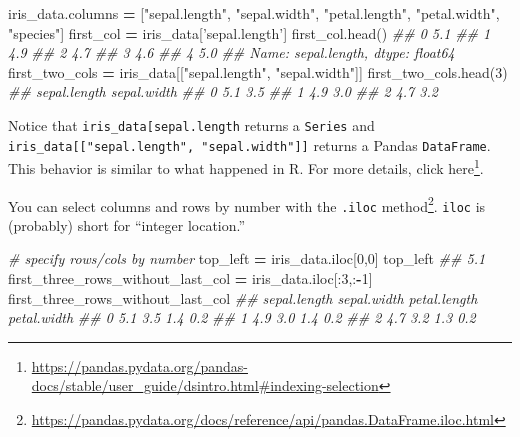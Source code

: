 \documentclass[12pt,krantz2]{krantz}
\makeatletter
\newenvironment{Shaded}{\begin{snugshade}}{\end{snugshade}}
\newcommand{\CommentTok}[1]{\textcolor[rgb]{0.37,0.37,0.37}{\textit{#1}}}
\newcommand{\DecValTok}[1]{\textcolor[rgb]{0.06,0.06,0.06}{#1}}
\newcommand{\NormalTok}[1]{#1}
\newcommand{\OperatorTok}[1]{\textcolor[rgb]{0.43,0.43,0.43}{\textbf{#1}}}
\newcommand{\StringTok}[1]{\textcolor[rgb]{0.5,0.5,0.5}{#1}}
\renewcommand{\href}[2]{#2\footnote{\url{#1}}}
\newenvironment{kframe}{%
\medskip{}
\setlength{\fboxsep}{.8em}
 \def\at@end@of@kframe{}%
 \ifinner\ifhmode%
  \def\at@end@of@kframe{\end{minipage}}%
  \begin{minipage}{\columnwidth}%
 \fi\fi%
 \def\FrameCommand##1{\hskip\@totalleftmargin \hskip-\fboxsep
 \colorbox{shadecolor}{##1}\hskip-\fboxsep
     \hskip-\linewidth \hskip-\@totalleftmargin \hskip\columnwidth}%
 \MakeFramed {\advance\hsize-\width
   \@totalleftmargin\z@ \linewidth\hsize
   \@setminipage}}%
 {\par\unskip\endMakeFramed%
 \at@end@of@kframe}
\renewenvironment{Shaded}{\begin{kframe}}{\end{kframe}}
\makeatother
\begin{document}
\begin{Shaded}
\begin{Highlighting}[]
\NormalTok{iris_data.columns }\OperatorTok{=}\NormalTok{ [}\StringTok{"sepal.length"}\NormalTok{, }\StringTok{"sepal.width"}\NormalTok{, }\StringTok{"petal.length"}\NormalTok{, }
                      \StringTok{"petal.width"}\NormalTok{, }\StringTok{"species"}\NormalTok{]}
\NormalTok{first_col }\OperatorTok{=}\NormalTok{ iris_data[}\StringTok{'sepal.length'}\NormalTok{]}
\NormalTok{first_col.head()}
\CommentTok{## 0    5.1}
\CommentTok{## 1    4.9}
\CommentTok{## 2    4.7}
\CommentTok{## 3    4.6}
\CommentTok{## 4    5.0}
\CommentTok{## Name: sepal.length, dtype: float64}
\NormalTok{first_two_cols }\OperatorTok{=}\NormalTok{ iris_data[[}\StringTok{"sepal.length"}\NormalTok{, }\StringTok{"sepal.width"}\NormalTok{]]}
\NormalTok{first_two_cols.head(}\DecValTok{3}\NormalTok{)}
\CommentTok{##    sepal.length  sepal.width}
\CommentTok{## 0           5.1          3.5}
\CommentTok{## 1           4.9          3.0}
\CommentTok{## 2           4.7          3.2}
\end{Highlighting}
\end{Shaded}

\begin{rmd-details}
Notice that \texttt{iris\_data{[}\textquotesingle{}sepal.length\textquotesingle{}{]}} returns a \texttt{Series} and \texttt{iris\_data{[}{[}"sepal.length",\ "sepal.width"{]}{]}} returns a Pandas \texttt{DataFrame}. This behavior is similar to what happened in R. For more details, click \href{https://pandas.pydata.org/pandas-docs/stable/user_guide/dsintro.html\#indexing-selection}{here}.

\end{rmd-details}

You can select columns and rows by number with the \href{https://pandas.pydata.org/docs/reference/api/pandas.DataFrame.iloc.html}{\texttt{.iloc} method}. \texttt{iloc} is (probably) short for ``integer location.''

\begin{Shaded}
\begin{Highlighting}[]
\CommentTok{# specify rows/cols by number}
\NormalTok{top_left }\OperatorTok{=}\NormalTok{ iris_data.iloc[}\DecValTok{0}\NormalTok{,}\DecValTok{0}\NormalTok{]}
\NormalTok{top_left}
\CommentTok{## 5.1}
\NormalTok{first_three_rows_without_last_col }\OperatorTok{=}\NormalTok{ iris_data.iloc[:}\DecValTok{3}\NormalTok{,:}\OperatorTok{-}\DecValTok{1}\NormalTok{]}
\NormalTok{first_three_rows_without_last_col}
\CommentTok{##    sepal.length  sepal.width  petal.length  petal.width}
\CommentTok{## 0           5.1          3.5           1.4          0.2}
\CommentTok{## 1           4.9          3.0           1.4          0.2}
\CommentTok{## 2           4.7          3.2           1.3          0.2}
\end{Highlighting}
\end{Shaded}
\end{document}
